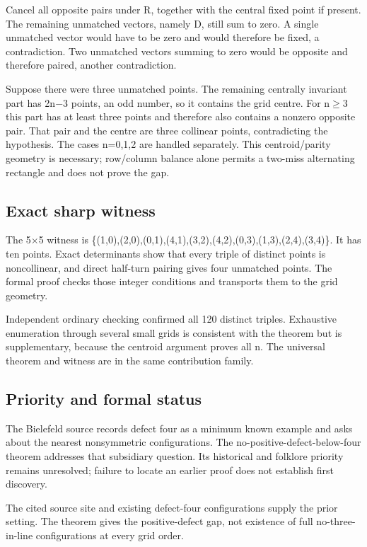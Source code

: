 \documentclass[11pt,a4paper]{article}
\begin{document}
Cancel all opposite pairs under R, together with the central fixed point if present. The remaining unmatched vectors, namely D, still sum to zero. A single unmatched vector would have to be zero and would therefore be fixed, a contradiction. Two unmatched vectors summing to zero would be opposite and therefore paired, another contradiction.

Suppose there were three unmatched points. The remaining centrally invariant part has 2n\ensuremath{-}3 points, an odd number, so it contains the grid centre. For n\ensuremath{\geq}3 this part has at least three points and therefore also contains a nonzero opposite pair. That pair and the centre are three collinear points, contradicting the hypothesis. The cases n=0,1,2 are handled separately. This centroid/parity geometry is necessary; row/column balance alone permits a two-miss alternating rectangle and does not prove the gap.

\subsection{Exact sharp witness}
The 5\ensuremath{\times}5 witness is \{(1,0),(2,0),(0,1),(4,1),(3,2),(4,2),(0,3),(1,3),(2,4),(3,4)\}. It has ten points. Exact determinants show that every triple of distinct points is noncollinear, and direct half-turn pairing gives four unmatched points. The formal proof checks those integer conditions and transports them to the grid geometry.

Independent ordinary checking confirmed all 120 distinct triples. Exhaustive enumeration through several small grids is consistent with the theorem but is supplementary, because the centroid argument proves all n. The universal theorem and witness are in the same contribution family.

\subsection{Priority and formal status}
The Bielefeld source records defect four as a minimum known example and asks about the nearest nonsymmetric configurations. The no-positive-defect-below-four theorem addresses that subsidiary question. Its historical and folklore priority remains unresolved; failure to locate an earlier proof does not establish first discovery.

The cited source site and existing defect-four configurations supply the prior setting. The theorem gives the positive-defect gap, not existence of full no-three-in-line configurations at every grid order.
\end{document}
